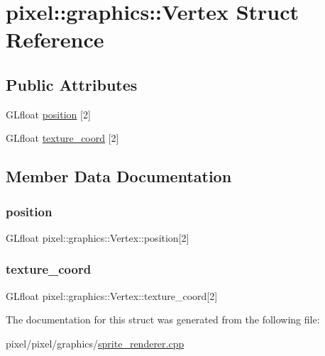 \hypertarget{structpixel_1_1graphics_1_1_vertex}{}\section{pixel\+:\+:graphics\+:\+:Vertex Struct Reference}
\label{structpixel_1_1graphics_1_1_vertex}
\subsection*{Public Attributes}
\begin{DoxyCompactItemize}
\item 
G\+Lfloat \hyperlink{structpixel_1_1graphics_1_1_vertex_ab976ffd01f06ec93531d9fd75b69d733}{position} \mbox{[}2\mbox{]}
\item 
G\+Lfloat \hyperlink{structpixel_1_1graphics_1_1_vertex_ac5f136e6d94c4cda12c5bd5922932b40}{texture\+\_\+coord} \mbox{[}2\mbox{]}
\end{DoxyCompactItemize}


\subsection{Member Data Documentation}
\mbox{\label{structpixel_1_1graphics_1_1_vertex_ab976ffd01f06ec93531d9fd75b69d733}} 
\subsubsection{\texorpdfstring{position}{position}}
{\footnotesize\ttfamily G\+Lfloat pixel\+::graphics\+::\+Vertex\+::position\mbox{[}2\mbox{]}}

\mbox{\label{structpixel_1_1graphics_1_1_vertex_ac5f136e6d94c4cda12c5bd5922932b40}} 
\subsubsection{\texorpdfstring{texture\+\_\+coord}{texture\_coord}}
{\footnotesize\ttfamily G\+Lfloat pixel\+::graphics\+::\+Vertex\+::texture\+\_\+coord\mbox{[}2\mbox{]}}



The documentation for this struct was generated from the following file\+:\begin{DoxyCompactItemize}
\item 
pixel/pixel/graphics/\hyperlink{sprite__renderer_8cpp}{sprite\+\_\+renderer.\+cpp}\end{DoxyCompactItemize}
